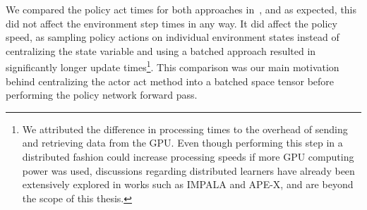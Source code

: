 \documentclass[11pt]{article}
\begin{document}
    We compared the policy act times for both approaches in~,
    and as expected, this did not affect the environment step times in any way.
    It did affect the policy speed, as sampling policy actions on individual environment states instead of
    centralizing the state variable and using a batched approach resulted in significantly longer update times\footnote{
        We attributed the difference in processing times to the overhead of sending and retrieving data from the GPU.
        Even though performing this step in a distributed fashion could increase processing speeds if more GPU computing power was used,
        discussions regarding distributed learners have already been extensively explored in works such as IMPALA and APE-X,
        and are beyond the scope of this thesis.
    }.
    This comparison was our main motivation behind centralizing the actor act method into a batched space tensor
    before performing the policy network forward pass.
\end{document}
